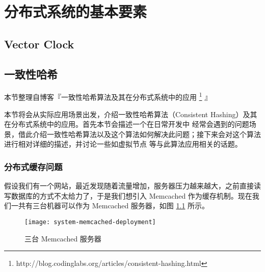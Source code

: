 \chapter{分布式系统的基本要素}\label{chap:distributed-system}

\begin{intro}

\end{intro}

\section{Vector Clock}\label{sec:vector-clock}

\subsection{}

\subsection{}


\section{一致性哈希}\label{sec:consistent-hasing}

本节整理自博客『一致性哈希算法及其在分布式系统中的应用%
\footnote{http://blog.codinglabs.org/articles/consistent-hashing.html}%
』

本节将会从实际应用场景出发，介绍一致性哈希算法（Consistent Hashing）及其在分布式系统中的应用。首先本节会描述一个在日常开发中
经常会遇到的问题场景，借此介绍一致性哈希算法以及这个算法如何解决此问题；接下来会对这个算法进行相对详细的描述，并讨论一些如虚拟节点
等与此算法应用相关的话题。

\subsection{分布式缓存问题}

假设我们有一个网站，最近发现随着流量增加，服务器压力越来越大，之前直接读写数据库的方式不太给力了，于是我们想引入 Memcached
作为缓存机制。现在我们一共有三台机器可以作为 Memcached 服务器，如图 \ref{fig:system-memcached-deployment} 所示。

\begin{figure}[hbtp]
\centering
\texttt{[image: system-memcached-deployment]}
\caption{三台 Memcached 服务器}
\label{fig:system-memcached-deployment}
\end{figure}

